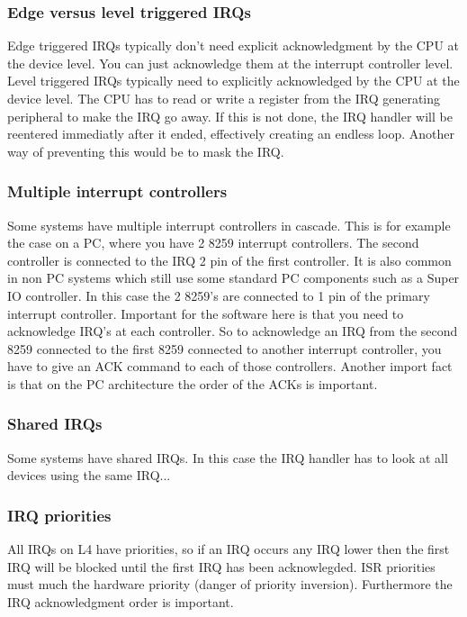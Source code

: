 \subsubsection{Edge versus level triggered IRQs}

Edge triggered IRQs typically don't need explicit acknowledgment by
the CPU at the device level. You can just acknowledge them at the
interrupt controller level.  Level triggered IRQs typically need to
explicitly acknowledged by the CPU at the device level. The CPU has to
read or write a register from the IRQ generating peripheral to make
the IRQ go away. If this is not done, the IRQ handler will be
reentered immediatly after it ended, effectively creating an endless
loop. Another way of preventing this would be to mask the IRQ.

\subsubsection{Multiple interrupt controllers}

Some systems have multiple interrupt controllers in cascade. This is
for example the case on a PC, where you have 2 8259 interrupt
controllers. The second controller is connected to the IRQ 2 pin of
the first controller. It is also common in non PC systems which still
use some standard PC components such as a Super IO controller. In this
case the 2 8259's are connected to 1 pin of the primary interrupt
controller. Important for the software here is that you need to
acknowledge IRQ's at each controller. So to acknowledge an IRQ from
the second 8259 connected to the first 8259 connected to another
interrupt controller, you have to give an ACK command to each of those
controllers.  Another import fact is that on the PC architecture the
order of the ACKs is important.

\subsubsection{Shared IRQs}

Some systems have shared IRQs. In this case the IRQ handler has to
look at all devices using the same IRQ...

\subsubsection{IRQ priorities}

All IRQs on L4 have priorities, so if an IRQ occurs any IRQ lower then
the first IRQ will be blocked until the first IRQ has been
acknowlegded.  ISR priorities must much the hardware priority (danger
of priority inversion).  Furthermore the IRQ acknowledgment order is
important.

